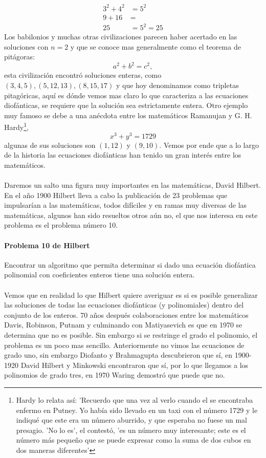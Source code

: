 \documentclass{article}
\begin{document}
\begin{align*}
3^2 + 4^2 &= 5^2\\
9 + 16 &= \\
25 &= 5^2 = 25
\end{align*}
Los babilonios y muchas otras civilizaciones parecen haber acertado en las soluciones con $n=2$ y que se conoce mas generalmente como el teorema de pitágoras:
$$a^2 + b^2 = c^2,$$
esta civilización encontró soluciones enteras, como $(3,4,5), (5, 12, 13), (8, 15, 17)$ y que hoy denominamos como tripletas pitagóricas, aquí es dónde vemos mas claro lo que caracteriza a las ecuaciones diofánticas, se requiere que la solución sea estrictamente entera.
Otro ejemplo muy famoso se debe a una anécdota entre los matemáticos Ramanujan y G. H. Hardy\footnote{Hardy lo relata así: 'Recuerdo que una vez al verlo cuando el se encontraba enfermo en Putney. Yo había sido llevado en un taxi con el número 1729 y le indiqué que este era un número aburrido, y que esperaba no fuese un mal presagio. 'No lo es', el contestó, 'es un número muy interesante; este es el número más pequeño que se puede expresar como la suma de dos cubos en dos maneras diferentes'},
$$x^3 + y^3  = 1729$$
algunas de sus soluciones son $(1, 12)$ y $(9,10)$. Vemos por ende que a lo largo de la historia las ecuaciones diofánticas han tenido un gran interés entre los matemáticos.

\paragraph{}Daremos un salto una figura muy importantes en las matemáticas, David Hilbert. En el año 1900 Hilbert lleva a cabo la publicación de 23 problemas que impulsarían a las matemáticas, todos difíciles y en ramas muy diversas de las matemáticas, algunos han sido resueltos otros aún no, el que nos interesa en este problema es el problema número 10.
\paragraph{Problema 10 de Hilbert} Encontrar un algoritmo que permita determinar si dado una ecuación diofántica polinomial con coeficientes enteros tiene una solución entera.
\paragraph{} Vemos que en realidad lo que Hilbert quiere averiguar es si es posible generalizar las soluciones de todas las ecuaciones diofánticas (y polinomiales) dentro del conjunto de los enteros. 70 años después colaboraciones entre los matemáticos Davis, Robinson, Putnam y culminando con Matiyasevich es que en 1970 se determina que no es posible. Sin embargo si se restringe el grado el polinomio, el problema es un poco mas sencillo\cite{andrew_s_2019}. Anteriormente no vimos las ecuaciones de grado uno, sin embargo Diofanto y Brahmagupta descubrieron que sí, en 1900-1920 David Hilbert y Minkowski encontraron que sí, por lo que llegamos a los polinomios de grado tres, en 1970 Waring demostró que puede que no.
\end{document}
